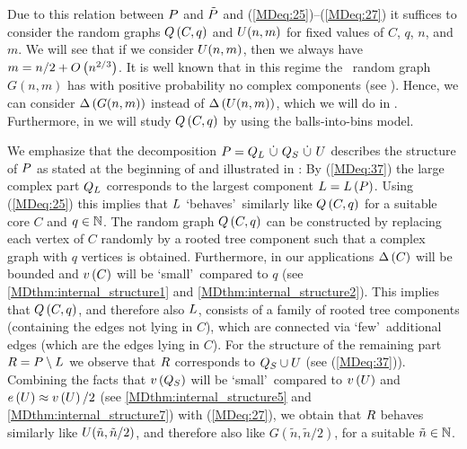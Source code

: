 Due to this relation between $P$ and $\tilde{P}$ and (\ref{MDeq:25})--(\ref{MDeq:27}) it suffices to consider the random graphs $Q\left(C,q\right)$ and $U(n,m)$ for fixed values of $C$, $q$, $n$, and $m$. We will see that if we consider $U(n,m)$, then we always have $m=n/2+O\left(n^{2/3}\right)$. It is well known that in this regime the \ER\ random graph $G(n,m)$ has with positive probability no complex components (see ). Hence, we can consider $\Delta\left(G(n,m)\right)$ instead of $\Delta\left(U(n,m)\right)$, which we will do in . Furthermore, in  we will study $Q\left(C,q\right)$ by using the balls-into-bins model.

We emphasize that the decomposition $P=Q_L~\dot{\cup}~Q_S~\dot{\cup}~U$ describes the structure of $P$ as stated at the beginning of  and illustrated in : By (\ref{MDeq:37}) the large complex part $Q_L$ corresponds to the largest component $L=L\left(P\right)$. Using (\ref{MDeq:25}) this implies that $L$ \lq behaves\rq\ similarly like $Q\left(C,q\right)$ for a suitable core $C$ and $q\in \mathbb{N}$. The random graph $Q\left(C,q\right)$ can be constructed by replacing each vertex of $C$ randomly by a rooted tree component such that a complex graph with $q$ vertices is obtained. Furthermore, in our applications $\Delta\left(C\right)$ will be bounded and $v\left({C}\right)$ will be \lq small\rq\ compared to $q$ (see \ref{MDthm:internal_structure1} and \ref{MDthm:internal_structure2}). This implies that $Q\left(C,q\right)$, and therefore also $L$, consists of a family of rooted tree components (containing the edges not lying in $C$), which are connected via \lq few\rq\ additional edges (which are the edges lying in $C$). For the structure of the remaining part $R=P\setminus L$ we observe that $R$ corresponds to $Q_S \cup U$ (see (\ref{MDeq:37})). Combining the facts that $v\left({Q_S}\right)$ will be \lq small\rq\ compared to $v\left({U}\right)$ and $e\left({U}\right)\approx v\left({U}\right)/2$ (see \ref{MDthm:internal_structure5} and \ref{MDthm:internal_structure7}) with (\ref{MDeq:27}), we obtain that $R$ behaves similarly like $U(\tilde{n},\tilde{n}/2)$, and therefore also like $G(\tilde{n},\tilde{n}/2)$, for a suitable $\tilde{n}\in\mathbb{N}$.

